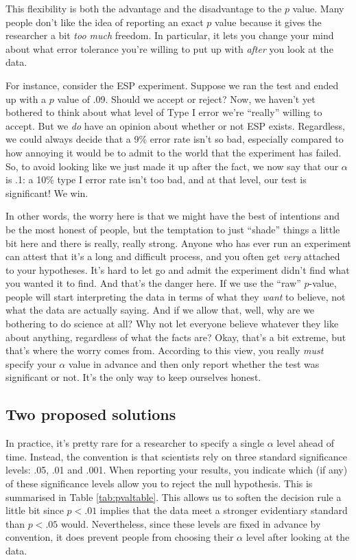 \documentclass[
  11pt,
  a4paper,
  twoside,symmetric,openright]{book}
\theoremstyle{break}
\theoremstyle{break}
\begin{document}
This flexibility is both the advantage and the disadvantage to the \(p\) value. Many people don't like the idea of reporting an exact \(p\) value because it gives the researcher a bit \emph{too much} freedom. In particular, it lets you change your mind about what error tolerance you're willing to put up with \emph{after} you look at the data.

For instance, consider the ESP experiment. Suppose we ran the test and ended up with a \(p\) value of .09. Should we accept or reject? Now, we haven't yet bothered to think about what level of Type I error we're ``really'' willing to accept. But we \emph{do} have an opinion about whether or not ESP exists. Regardless, we could always decide that a 9\% error rate isn't so bad, especially compared to how annoying it would be to admit to the world that the experiment has failed. So, to avoid looking like we just made it up after the fact, we now say that our \(\alpha\) is .1: a 10\% type I error rate isn't too bad, and at that level, our test is significant! We win.

In other words, the worry here is that we might have the best of intentions and be the most honest of people, but the temptation to just ``shade'' things a little bit here and there is really, really strong. Anyone who has ever run an experiment can attest that it's a long and difficult process, and you often get \emph{very} attached to your hypotheses. It's hard to let go and admit the experiment didn't find what you wanted it to find. And that's the danger here. If we use the ``raw'' \(p\)-value, people will start interpreting the data in terms of what they \emph{want} to believe, not what the data are actually saying. And if we allow that, well, why are we bothering to do science at all? Why not let everyone believe whatever they like about anything, regardless of what the facts are? Okay, that's a bit extreme, but that's where the worry comes from. According to this view, you really \emph{must} specify your \(\alpha\) value in advance and then only report whether the test was significant or not. It's the only way to keep ourselves honest.

\subsection{Two proposed solutions}\label{two-proposed-solutions}

In practice, it's pretty rare for a researcher to specify a single \(\alpha\) level ahead of time. Instead, the convention is that scientists rely on three standard significance levels: .05, .01 and .001. When reporting your results, you indicate which (if any) of these significance levels allow you to reject the null hypothesis. This is summarised in Table \ref{tab:pvaltable}. This allows us to soften the decision rule a little bit since \(p<.01\) implies that the data meet a stronger evidentiary standard than \(p<.05\) would. Nevertheless, since these levels are fixed in advance by convention, it does prevent people from choosing their \(\alpha\) level after looking at the data.
\end{document}
